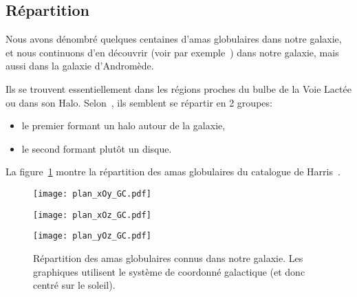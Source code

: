 		\subsection{Répartition}

			Nous avons dénombré quelques centaines d'amas globulaires dans
			notre galaxie, et nous continuons d'en découvrir (voir par
			exemple~\cite{2014ApJ...786L...3L}) dans notre galaxie, mais aussi dans la galaxie d'Andromède.

			Ils se trouvent essentiellement dans les régions proches du
			bulbe de la Voie Lactée ou dans son Halo. Selon~\cite{MH-AAR1997}, ils semblent
			se répartir en 2 groupes:
			\begin{itemize}
				\item le premier formant un halo autour de la galaxie,
				\item le second formant plutôt un disque.
			\end{itemize}

			La figure~\ref{Fig::Intro::repartition} montre la répartition des amas globulaires du catalogue de Harris~\cite{Harris}.
			\begin{figure}
				\begin{minipage}{0.45\textwidth}
					\begin{center}
						\texttt{[image: plan\_xOy\_GC.pdf]}
					\end{center}
				\end{minipage}\hfill
				\begin{minipage}{0.45\textwidth}
					\begin{center}
						\texttt{[image: plan\_xOz\_GC.pdf]}
					\end{center}
				\end{minipage}
				\begin{center}
					\begin{minipage}{0.45\textwidth}
						\texttt{[image: plan\_yOz\_GC.pdf]}
					\end{minipage}
				\end{center}
				\caption{\label{Fig::Intro::repartition}Répartition des amas globulaires connus dans notre galaxie. Les graphiques utilisent le système de coordonné galactique (et donc centré sur le soleil).}
			\end{figure}


